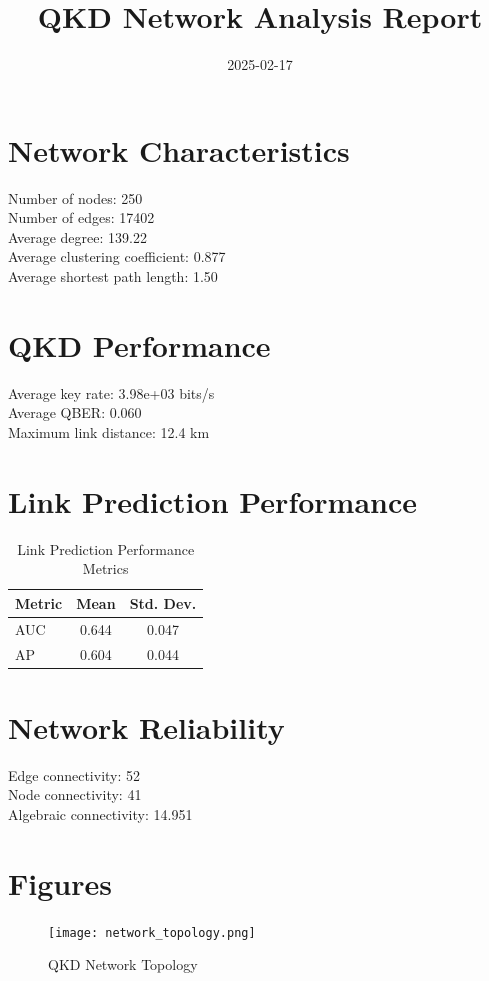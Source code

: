 \documentclass{article}
\title{QKD Network Analysis Report}
\date{2025-02-17}
\begin{document}
    \maketitle

    \section{Network Characteristics}
    Number of nodes: 250 \\
    Number of edges: 17402 \\
    Average degree: 139.22 \\
    Average clustering coefficient: 0.877 \\
    Average shortest path length: 1.50

    \section{QKD Performance}
    Average key rate: 3.98e+03 bits/s \\
    Average QBER: 0.060 \\
    Maximum link distance: 12.4 km

    \section{Link Prediction Performance}
    \begin{table}[H]
    \centering
    \begin{tabular}{lcc}
    \toprule
    Metric & Mean & Std. Dev. \\
    \midrule
    AUC & 0.644 &
        0.047 \\
    AP & 0.604 &
        0.044 \\
    \bottomrule
    \end{tabular}
    \caption{Link Prediction Performance Metrics}
    \end{table}

    \section{Network Reliability}
    Edge connectivity: 52 \\
    Node connectivity: 41 \\
    Algebraic connectivity: 14.951

    \section{Figures}
    \begin{figure}[H]
    \centering
    \texttt{[image: network\_topology.png]}
    \caption{QKD Network Topology}
    \end{figure}
\end{document}
